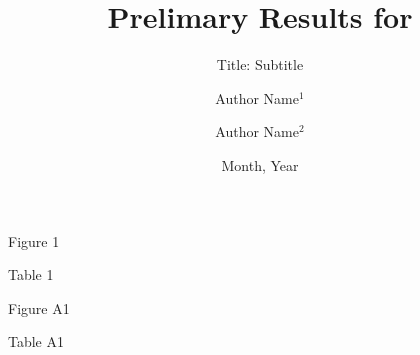 \documentclass[
  ignorenonframetext,
  aspectratio=169]{beamer}
\title{Prelimary Results for}
\subtitle{Title: Subtitle}
\author{Author Name\(^1\) \and Author Name\(^2\)}
\date{Month, Year}
\institute{\(^1\)Institution \and \(^2\)Institution}
\begin{document}
\frame{\titlepage}

\begin{frame}{Figure 1}
\protect\hypertarget{figure-1}{}
\end{frame}

\begin{frame}{Table 1}
\protect\hypertarget{table-1}{}
\vspace{-0.5cm}
\end{frame}

\begin{frame}{Figure A1}
\protect\hypertarget{figure-a1}{}
\end{frame}

\begin{frame}{Table A1}
\protect\hypertarget{table-a1}{}
\vspace{-0.5cm}
\end{frame}
\end{document}
